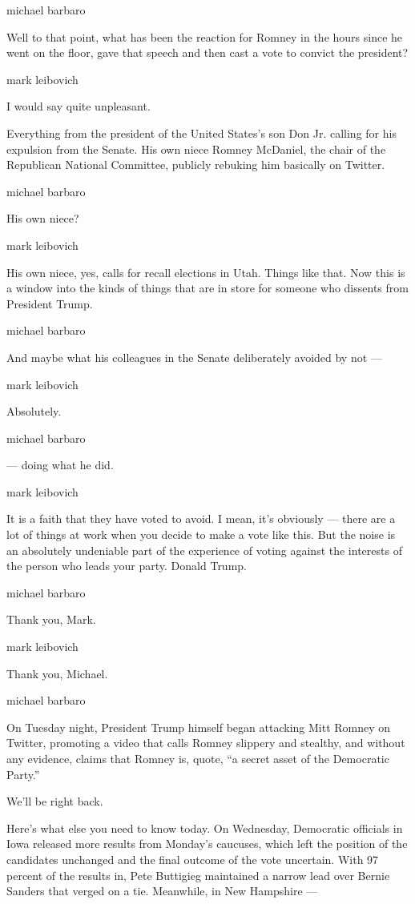 michael barbaro

Well to that point, what has been the reaction for Romney in the hours
since he went on the floor, gave that speech and then cast a vote to
convict the president?

mark leibovich

I would say quite unpleasant.

Everything from the president of the United States's son Don Jr. calling
for his expulsion from the Senate. His own niece Romney McDaniel, the
chair of the Republican National Committee, publicly rebuking him
basically on Twitter.

michael barbaro

His own niece?

mark leibovich

His own niece, yes, calls for recall elections in Utah. Things like
that. Now this is a window into the kinds of things that are in store
for someone who dissents from President Trump.

michael barbaro

And maybe what his colleagues in the Senate deliberately avoided by not
---

mark leibovich

Absolutely.

michael barbaro

--- doing what he did.

mark leibovich

It is a faith that they have voted to avoid. I mean, it's obviously ---
there are a lot of things at work when you decide to make a vote like
this. But the noise is an absolutely undeniable part of the experience
of voting against the interests of the person who leads your party.
Donald Trump.

michael barbaro

Thank you, Mark.

mark leibovich

Thank you, Michael.

michael barbaro

On Tuesday night, President Trump himself began attacking Mitt Romney on
Twitter, promoting a video that calls Romney slippery and stealthy, and
without any evidence, claims that Romney is, quote, ``a secret asset of
the Democratic Party.''

We'll be right back.

Here's what else you need to know today. On Wednesday, Democratic
officials in Iowa released more results from Monday's caucuses, which
left the position of the candidates unchanged and the final outcome of
the vote uncertain. With 97 percent of the results in, Pete Buttigieg
maintained a narrow lead over Bernie Sanders that verged on a tie.
Meanwhile, in New Hampshire ---

